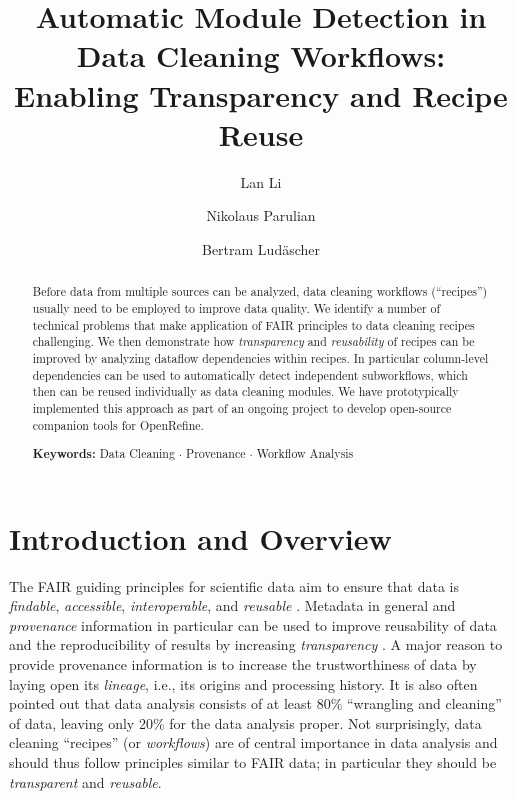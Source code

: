 \documentclass[conference]{ijdc-v14}
\title{\bf Automatic Module Detection in Data Cleaning Workflows: \\ Enabling Transparency and Recipe Reuse}
\author{Lan Li}
\affil{School of Information Sciences \\ University of Illinois, Urbana-Champaign}
\author{Nikolaus Parulian}
\affil{School of Information Sciences \\ University of Illinois, Urbana-Champaign}
\author{Bertram Lud\"ascher}
\affil{School of Information Sciences \\ University of Illinois, Urbana-Champaign}
\newcommand{\orma}{\textsf{ORMA}\xspace}  %
\newcommand{\openrefine}{\textrm{OpenRefine}\xspace}
\begin{document}
\maketitle

\begin{abstract}
  Before data from multiple sources can be analyzed, data cleaning workflows (``recipes'') usually
  need to be employed to improve data quality. We identify a number of technical problems that make
  application of FAIR principles to data cleaning recipes challenging. We then demonstrate how
  \emph{transparency} and \emph{reusability} of recipes can be improved by analyzing dataflow
  dependencies within recipes. In particular {column-level dependencies} can be used to {automatically detect independent
    subworkflows}, which then can be reused individually as data cleaning modules. We have
  prototypically implemented
  this approach as part of an ongoing project to develop open-source companion tools for \openrefine.

\bigskip

\textbf{Keywords:} Data Cleaning $\cdot$ Provenance $\cdot$ Workflow Analysis
\end{abstract}


\section{Introduction and Overview}

The FAIR guiding principles for scientific data aim to ensure that data is \emph{findable}, \emph{accessible}, \emph{interoperable}, and \emph{reusable} \cite{wilkinson_fair_2016}.
%
Metadata in general and \emph{provenance} information in particular can be used to improve
reusability of data and the reproducibility of results by increasing \emph{transparency}
\cite{nosek2015promoting,mcphillips2019reproducibility}. A major reason to provide provenance
information is to increase the trustworthiness of data by laying open its \emph{lineage}, i.e., its origins
and processing history.
% 
It is also often pointed out that data analysis %
consists of at least 80\% ``wrangling and cleaning'' of data, leaving only 20\% for the data
analysis proper. Not surprisingly, data cleaning ``recipes'' (or \emph{workflows}) are of central
importance in data analysis and should thus follow principles similar to FAIR data; in particular
they should be \emph{transparent} and \emph{reusable}.
\end{document}
